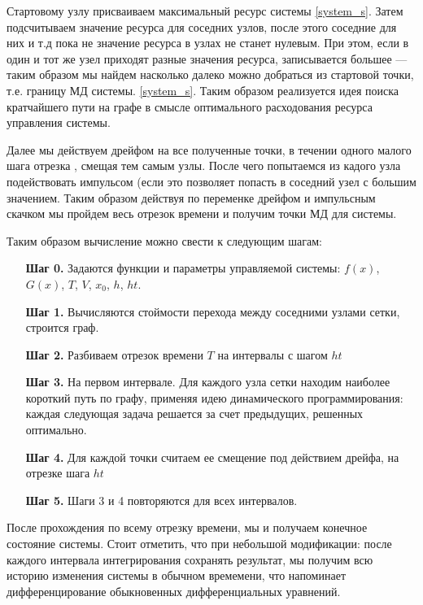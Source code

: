 Стартовому узлу присваиваем максимальный ресурс системы \eqref{system_s}. Затем
подсчитываем значение ресурса для соседних узлов, после этого соседние
для них и т.д пока не значение ресурса в узлах не станет нулевым. При
этом, если в один и тот же узел приходят разные значения ресурса,
записывается большее — таким образом мы найдем насколько далеко можно
добраться из стартовой точки, т.е. границу МД системы. \eqref{system_s}. Таким
образом реализуется идея поиска кратчайшего пути на графе в смысле
оптимального расходования ресурса управления системы.

Далее мы действуем дрейфом на все полученные точки, в течении одного
малого шага отрезка , смещая тем самым узлы. После чего попытаемся из
кадого узла подействовать импульсом (если это позволяет попасть в
соседний узел с большим значением.  Таким образом действуя по
переменке дрейфом и импульсным скачком мы пройдем весь отрезок времени
и получим точки МД для системы.

Таким образом вычисление можно свести к следующим шагам:
\begin{itemize}
\item[\bf Шаг 0.] Задаются функции и параметры управляемой системы:
  $f(x)$, $G(x)$, $T$, $V$, $x_0$, $h$, $ht$.
\item[\bf Шаг 1.] Вычисляются стоймости перехода между соседними
  узлами сетки, строится граф.
\item[\bf Шаг 2.] 
  Разбиваем отрезок времени $T$  на интервалы с шагом $ht$
\item[\bf Шаг 3.] 
  На первом интервале.
  Для каждого узла сетки находим наиболее короткий путь по графу,
  применяя идею динамического программирования: каждая следующая
  задача решается за счет предыдущих, решенных оптимально.
\item[\bf Шаг 4.] Для каждой точки считаем ее смещение под действием
  дрейфа, на отрезке шага $ht$
\item[\bf Шаг 5.] Шаги 3 и 4 повторяются для всех интервалов.
  
\end{itemize}

После прохождения по всему отрезку времени, мы и получаем конечное
состояние системы. Стоит отметить, что при небольшой модификации:
после каждого интервала интегрирования сохранять результат, мы получим
всю историю изменения системы в обычном времемени, что напоминает
дифференцирование обыкновенных дифференциальных уравнений.


